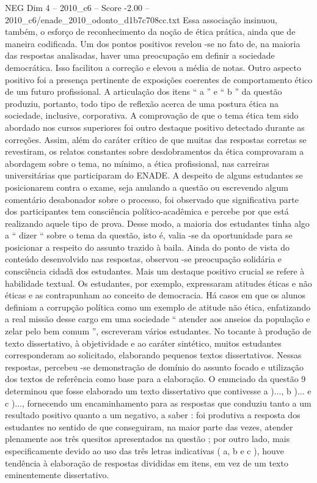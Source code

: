 \begin{textsample}{NEG Dim 4 – 2010\_c6 – Score -2.00 – 2010\_c6/enade\_2010\_odonto\_d1b7c708cc.txt}
Essa associação insinuou, também, o esforço de reconhecimento da noção de ética prática, ainda que de maneira codificada.
Um dos pontos positivos revelou -se no fato de, na maioria das respostas analisadas, haver uma preocupação em definir a sociedade democrática.
Isso facilitou a correção e elevou a média de notas.
Outro aspecto positivo foi a presença pertinente de exposições coerentes de comportamento ético de um futuro profissional.
A articulação dos itens “ a ” e “ b ” da questão produziu, portanto, todo tipo de reflexão acerca de uma postura ética na sociedade, inclusive, corporativa.
A comprovação de que o tema ética tem sido abordado nos cursos superiores foi outro destaque positivo detectado durante as correções.
Assim, além do caráter crítico de que muitas das respostas corretas se revestiram, os relatos constantes sobre desdobramentos da ética comprovaram a abordagem sobre o tema, no mínimo, a ética profissional, nas carreiras universitárias que participaram do ENADE.
A despeito de alguns estudantes se posicionarem contra o exame, seja anulando a questão ou escrevendo algum comentário desabonador sobre o processo, foi observado que significativa parte dos participantes tem consciência político-acadêmica e percebe por que está realizando aquele tipo de prova.
Desse modo, a maioria dos estudantes tinha algo a “ dizer “ sobre o tema da questão, isto é, valia -se da oportunidade para se posicionar a respeito do assunto trazido à baila.
Ainda do ponto de vista do conteúdo desenvolvido nas respostas, observou -se preocupação solidária e consciência cidadã dos estudantes.
Mais um destaque positivo crucial se refere à habilidade textual.
Os estudantes, por exemplo, expressaram atitudes éticas e não éticas e as contrapunham ao conceito de democracia.
Há casos em que os alunos definiam a corrupção política como um exemplo de atitude não ética, enfatizando a real missão desse cargo em uma sociedade “ atender aos anseios da população e zelar pelo bem comum ”, escreveram vários estudantes.
No tocante à produção de texto dissertativo, à objetividade e ao caráter sintético, muitos estudantes corresponderam ao solicitado, elaborando pequenos textos dissertativos.
Nessas respostas, percebeu -se demonstração de domínio do assunto focado e utilização dos textos de referência como base para a elaboração.
O enunciado da questão 9 determinou que fosse elaborado um texto dissertativo que contivesse a )..., b )... e c )..., fornecendo um encaminhamento para as respostas que conduziu tanto a um resultado positivo quanto a um negativo, a saber : foi produtiva a resposta dos estudantes no sentido de que conseguiram, na maior parte das vezes, atender plenamente aos três quesitos apresentados na questão ; por outro lado, mais especificamente devido ao uso das três letras indicativas ( a, b e c ), houve tendência à elaboração de respostas divididas em itens, em vez de um texto eminentemente dissertativo.

\end{textsample}
